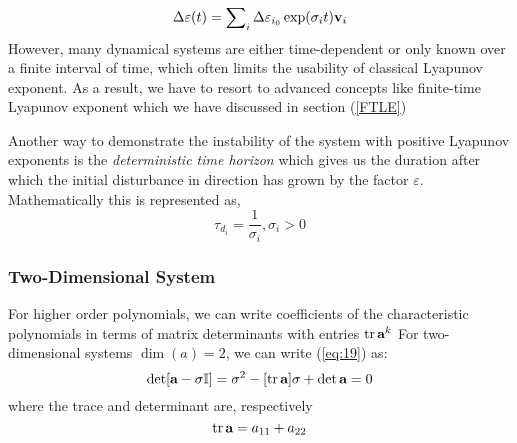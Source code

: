 \begin{equation}
\Delta\varepsilon(t) = \sum\nolimits_{i} \Delta\varepsilon_{i_{0}}\exp(\sigma_{i}t)\normalfont \textbf{v}_{i}
\end{equation}
However, many dynamical systems are either time-dependent or only known over a finite interval of time, which often limits the usability of classical Lyapunov exponent. As a result, we have to resort to advanced concepts like finite-time Lyapunov exponent which we have discussed in section (\ref{FTLE})

Another way to demonstrate the instability of the system with positive Lyapunov exponents is the \textit{deterministic time horizon} which gives us the duration after which the initial disturbance in direction  has grown by the factor $\varepsilon$. Mathematically this is represented as,
\begin{equation}
\tau_{d_{i}} = \frac{1}{\sigma_{i}},\sigma_{i} >0
\end{equation}

\subsubsection*{Two-Dimensional System}
For higher order polynomials, we can write coefficients of the characteristic polynomials in terms of matrix determinants with entries $ \operatorname{tr} \normalfont\textbf{a}^{k} $ For two-dimensional systems $\dim(a)=2$, we can write (\ref{eq:19}) as:
\begin{equation}
\det[\normalfont\textbf{a} - \sigma\mathbb{I}] = \sigma^{2} - [\operatorname{tr}\normalfont\textbf{a}]\sigma + \det\normalfont\textbf{a} = 0
\end{equation}
where the trace and determinant are, respectively
\begin{equation}
\operatorname{tr}\normalfont\textbf{a} = a_{11} + a_{22}
\end{equation}

